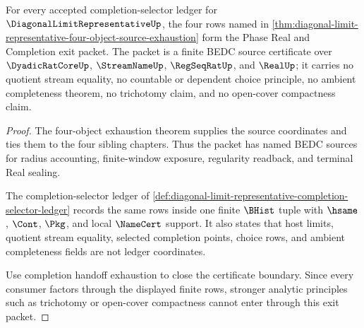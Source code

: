 \begin{theorem}
\label{thm:diagonal-limit-representative-phase-real-completion-exit-certificate}
For every accepted completion-selector ledger for $\DiagonalLimitRepresentativeUp$, the four rows named in \autoref{thm:diagonal-limit-representative-four-object-source-exhaustion} form the Phase Real and Completion exit packet. The packet is a finite BEDC source certificate over $\DyadicRatCoreUp$, $\StreamNameUp$, $\RegSeqRatUp$, and $\RealUp$; it carries no quotient stream equality, no countable or dependent choice principle, no ambient completeness theorem, no trichotomy claim, and no open-cover compactness claim.
\end{theorem}
\begin{proof}
The four-object exhaustion theorem supplies the source coordinates and ties them to the four sibling chapters. Thus the packet has named BEDC sources for radius accounting, finite-window exposure, regularity readback, and terminal Real sealing.

The completion-selector ledger of \autoref{def:diagonal-limit-representative-completion-selector-ledger} records the same rows inside one finite $\BHist$ tuple with $\hsame$, $\Cont$, $\Pkg$, and local $\NameCert$ support. It also states that host limits, quotient stream equality, selected completion points, choice rows, and ambient completeness fields are not ledger coordinates.

Use completion handoff exhaustion to close the certificate boundary. Since every consumer factors through the displayed finite rows, stronger analytic principles such as trichotomy or open-cover compactness cannot enter through this exit packet.
\end{proof}

